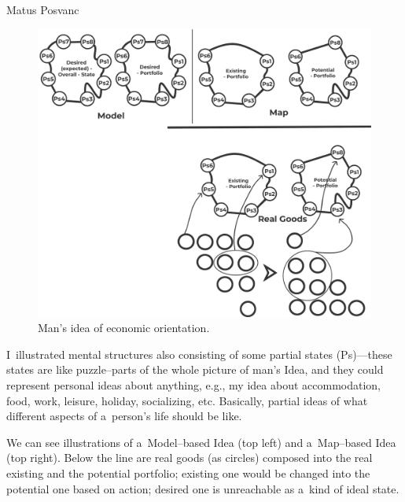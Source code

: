 \begin{artengenv}{Matus Posvanc}
\begin{figure}
 \begin{center}
 \includegraphics[width=1\textwidth]{ART_Posvanc/Illustration2_PU.pdf}%
 \end{center}%
 \caption{Man's idea of economic orientation.}\label{pos:fig2}
\end{figure}






I~illustrated mental structures also consisting of some partial states (Ps)---these states are like puzzle–parts of the whole picture of man's Idea, and they could represent personal ideas about anything, e.g., my idea about accommodation, food, work, leisure, holiday, socializing, etc. Basically, partial ideas of what different aspects of a~person's life should be like.



We can see illustrations of a~Model–based Idea (top left) and a~Map–based Idea (top right). Below the line are real goods (as circles) composed into the real existing and the potential portfolio; existing one would be changed into the potential one based on action; desired one is unreachable as a~kind of ideal state.




\end{artengenv}
